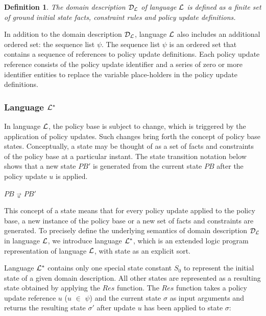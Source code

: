 \documentclass[11pt]{report}
\newtheorem{vdefinition}{Definition}[chapter]
\newenvironment{vquote}
{
  \begin{list}{}{\leftmargin 1em}\item[]
}
{
  \end{list}
}
\begin{document}
          \begin{vdefinition}
            \label{def-langl-domain}
            The domain description ${\cal D}_{\cal L}$ of language ${\cal L}$
            is defined as a finite set of ground initial state facts,
            constraint rules and policy update definitions.
          \end{vdefinition}

          In addition to the domain description ${\cal D}_{\cal L}$, language
          ${\cal L}$ also includes an additional ordered set: the sequence list
          $\psi$. The sequence list $\psi$ is an ordered set that contains a
          sequence of references to policy update definitions. Each policy
          update reference consists of the policy update identifier and a
          series of zero or more identifier entities to replace the variable
          place-holders in the policy update definitions.

        \subsubsection{Language ${\cal L}^{*}$}

          In language ${\cal L}$, the policy base is subject to change, which
          is triggered by the application of policy updates. Such changes bring
          forth the concept of policy base states. Conceptually, a state may be
          thought of as a set of facts and constraints of the policy base at a
          particular instant. The state transition notation below shows that a
          new state $PB'$ is generated from the current state $PB$ after the
          policy update $u$ is applied.

          \begin{vquote}
            $PB$ $\overrightarrow{_{u}}$ $PB'$
          \end{vquote}

          This concept of a state means that for every policy update applied
          to the policy base, a new instance of the policy base or a new set of
          facts and constraints are generated. To precisely define the
          underlying semantics of domain description ${\cal D}_{\cal L}$ in
          language ${\cal L}$, we introduce language ${\cal L}^{*}$, which is
          an extended logic program representation of language ${\cal L}$, with
          state as an explicit sort.

          Language ${\cal L}^{*}$ contains only one special state constant
          $S_{0}$ to represent the initial state of a given domain description.
          All other states are represented as a resulting state obtained by
          applying the $Res$ function. The $Res$ function takes a policy update
          reference $u$ ($u$ $\in$ $\psi$) and the current state $\sigma$ as
          input arguments and returns the resulting state $\sigma'$ after
          update $u$ has been applied to state $\sigma$:
\end{document}
